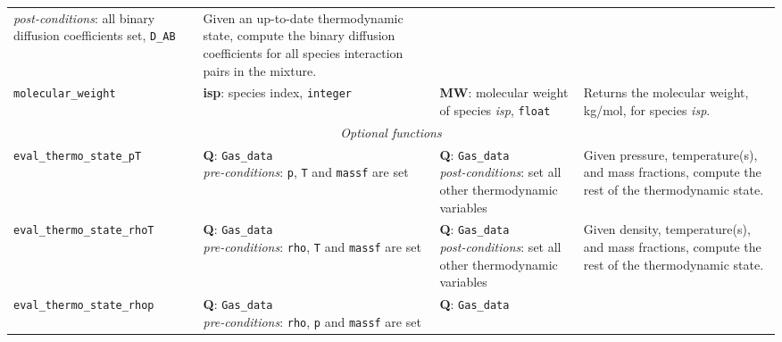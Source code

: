 \begin{landscape}
\begin{center}
\begin{longtable}{p{5.5cm}p{4.5cm}p{4.5cm}p{6.5cm}}
{                                                      \textit{post-conditions}: all binary diffusion coefficients set, \texttt{D\_AB}}
                                       & Given an up-to-date thermodynamic state, compute the binary diffusion coefficients for
                                         all species interaction pairs in the mixture. \\
\texttt{molecular\_weight}             & \raggedright{\textbf{isp}: species index, \texttt{integer}} 
                                       & \raggedright{\textbf{MW}: molecular weight of species \textit{isp}, \texttt{float}}
                                       & Returns the molecular weight, kg/mol, for species \textit{isp}. \\ \hline
\multicolumn{4}{c}{\emph{Optional functions}} \\
\texttt{eval\_thermo\_state\_pT} & \raggedright{\textbf{Q}: \texttt{Gas\_data} \\
                                                \textit{pre-conditions}: \texttt{p}, \texttt{T} and \texttt{massf} are set}
                                 & \raggedright{\textbf{Q}: \texttt{Gas\_data} \\
                                                  \textit{post-conditions}: set all other thermodynamic variables} 
                                   &   Given pressure, temperature(s), and mass fractions,
                                       compute the rest of the thermodynamic state. \\
\texttt{eval\_thermo\_state\_rhoT} & \raggedright{\textbf{Q}: \texttt{Gas\_data} \\
                                                \textit{pre-conditions}: \texttt{rho}, \texttt{T} and \texttt{massf} are set}
                                 & \raggedright{\textbf{Q}: \texttt{Gas\_data} \\
                                                  \textit{post-conditions}: set all other thermodynamic variables} 
                                   &   Given density, temperature(s), and mass fractions,
                                       compute the rest of the thermodynamic state. \\
\texttt{eval\_thermo\_state\_rhop} & \raggedright{\textbf{Q}: \texttt{Gas\_data} \\
                                                \textit{pre-conditions}: \texttt{rho}, \texttt{p} and \texttt{massf} are set}
                                 & \raggedright{\textbf{Q}: \texttt{Gas\_data} \\
}
\end{longtable}
\end{center}
\end{landscape}
